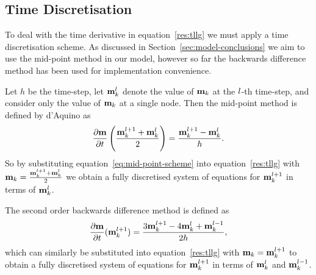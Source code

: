 \subsection{Time Discretisation}
\label{sec:time-discretisation-resi}

To deal with the time derivative in equation~\eqref{res:tllg} we must apply a time discretisation scheme. As discussed in Section~\ref{sec:model-conclusions} we aim to use the mid-point method in our model, however so far the backwards difference method has been used for implementation convenience.

Let $h$ be the time-step, let $\mathbf{m}_k^l$ denote the value of $\mathbf{m}_k$ at the $l$-th time-step, and consider only the value of $\mathbf{m}_k$ at a single node. Then the mid-point method is defined by d'Aquino\cite{DAquino2005} as
\begin{equation}
  \label{eq:mid-point-scheme}
  \frac{\partial \mathbf{m}}{\partial t} \left( \frac{\mathbf{m}_k^{l+1} + \mathbf{m}_k^l}{2} \right) = \frac{\mathbf{m}_k^{l+1} - \mathbf{m}_k^l}{ h}.
\end{equation}
So by substituting equation~\eqref{eq:mid-point-scheme} into equation~\eqref{res:tllg} with $\mathbf{m}_k = \frac{\mathbf{m}_k^{l+1} + \mathbf{m}^l_k}{2}$ we obtain a fully discretised system of equations for $\mathbf{m}_k^{l+1}$ in terms of $\mathbf{m}_k^l$.

The second order backwards difference method is defined as\cite{Atkinson2009}
\begin{equation}
  \label{eq:bdf2-scheme}
  \frac{\partial \mathbf{m}}{\partial t}(\mathbf{m}_k^{l+1}) = \frac{3 \mathbf{m}_k^{l+1} - 4 \mathbf{m}_k^{l} + \mathbf{m}_k^{l-1}}{2h},
\end{equation}
which can similarly be substituted into equation~\eqref{res:tllg} with $\mathbf{m}_k = \mathbf{m}_k^{l+1}$ to obtain a fully discretised system of equations for $\mathbf{m}_k^{l+1}$ in terms of $\mathbf{m}_k^l$ and $\mathbf{m}_k^{l-1}$.

